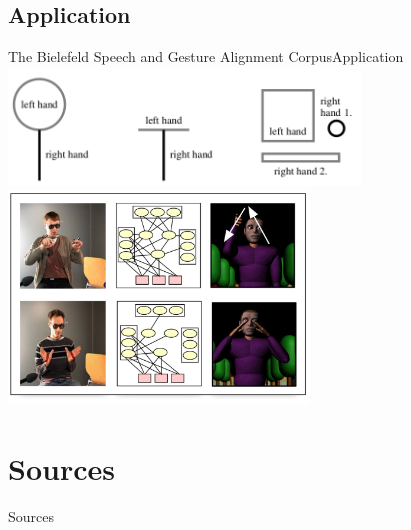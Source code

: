 \documentclass{beamer}
\begin{document}
		\subsection{Application}
			\begin{frame}{The Bielefeld Speech and Gesture Alignment Corpus}{Application}
				\center
						\includegraphics[width=0.7\textwidth]{Types}
						\vspace*{1cm}
						\includegraphics[width=0.6\textwidth]{Bayes}
			\end{frame}	
	
	\section{Sources}
		\begin{frame}{Sources}
			
			\nocite{Bielefeld2010}
			\nocite{Bielefeld2013}
			\nocite{Bergmann2014}
			\nocite{BAS2014}

  			\small
		\end{frame}
	
\end{document}
